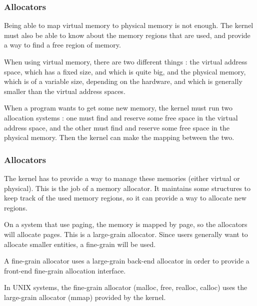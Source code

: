 \begin{frame}
  \frametitle{Allocators}

  Being able to map virtual memory to physical memory is not enough. The kernel must also be able to know about the memory regions that are used, and provide a way to find a free region of memory.

  \-

  When using virtual memory, there are two different things : the virtual address space, which has a fixed size, and which is quite big, and the physical memory, which is of a variable size, depending on the hardware, and which is generally smaller than the virtual address spaces.

  \-

  When a program wants to get some new memory, the kernel must run two allocation systems : one must find and reserve some free space in the virtual address space, and the other must find and reserve some free space in the physical memory. Then the kernel can make the mapping between the two.

\end{frame}

\begin{frame}
  \frametitle{Allocators}

  The kernel has to provide a way to manage these memories (either virtual or physical). This is the job of a memory allocator. It maintains some structures to keep track of the used memory regions, so it can provide a way to allocate new regions.

  \-

  On a system that use paging, the memory is mapped by page, so the allocators will allocate pages. This is a large-grain allocator. Since users generally want to allocate smaller entities, a fine-grain will be used.

  \-

  A fine-grain allocator uses a large-grain back-end allocator in order to provide a front-end fine-grain allocation interface.

  \-

  In UNIX systems, the fine-grain allocator (malloc, free, realloc, calloc) uses the large-grain allocator (mmap) provided by the kernel.

\end{frame}


